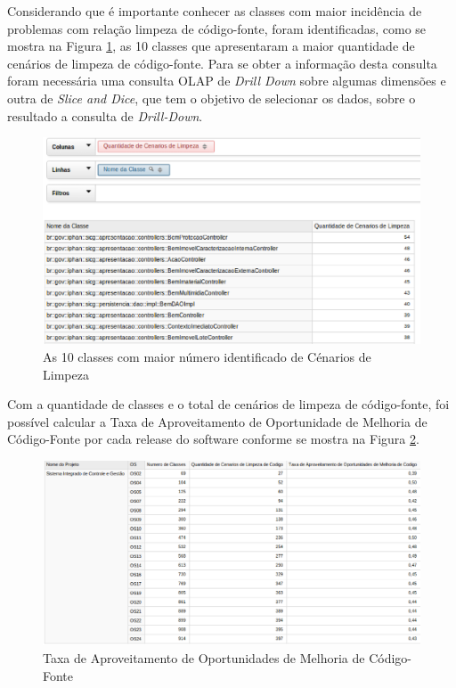 Considerando que é importante conhecer as classes com maior incidência de problemas com relação limpeza de código-fonte, foram identificadas, como se mostra na Figura \ref{fig:worst-10-cenarios}, as 10 classes que apresentaram a maior quantidade de cenários de limpeza de código-fonte. Para se obter a informação desta consulta foram necessária uma consulta OLAP de \textit{Drill Down} sobre algumas dimensões e outra de \textit{Slice and Dice}, que tem o objetivo de selecionar os dados, sobre o resultado a consulta de \textit{Drill-Down}.    

\begin{figure}[ht!]
\centering
\includegraphics[keepaspectratio=true,scale=0.55]{figuras/10-best.eps}
\caption{As 10 classes com maior número identificado de Cénarios de Limpeza}
\label{fig:worst-10-cenarios}
\end{figure}
\FloatBarrier

Com a quantidade de classes e o total de cenários de limpeza de código-fonte, foi possível calcular a Taxa de Aproveitamento de Oportunidade de Melhoria de Código-Fonte por cada release do software conforme se mostra na Figura \ref{fig:taxa-cenarios}.

\begin{figure}[H]
\centering
\includegraphics[keepaspectratio=true,scale=0.38]{figuras/taxa-parcial.eps}
\caption{Taxa de Aproveitamento de Oportunidades de Melhoria de Código-Fonte}
\label{fig:taxa-cenarios}
\end{figure}
\FloatBarrier

